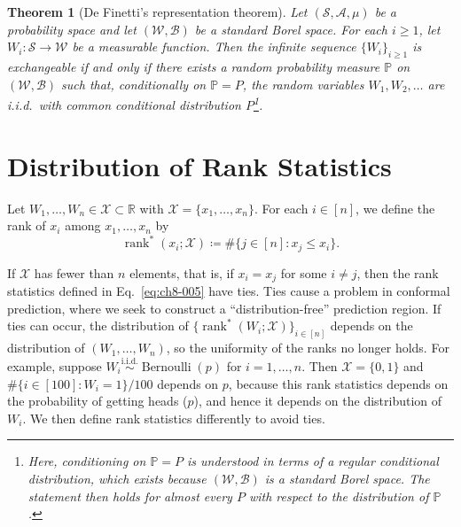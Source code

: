\documentclass[a4paper,12pt]{article}
\numberwithin{equation}{section}
\newcommand{\iid}{\overset{\text{i.i.d.}}{\sim}}
\theoremstyle{plain}
\newtheorem{theorem}{Theorem}[section]
\theoremstyle{definition}
\theoremstyle{remark}
\begin{document}
\begin{theorem}[De Finetti's representation theorem]
\label{theorem:ch8-07}
    Let $(\mathcal{S},\mathcal{A},\mu)$ be a probability space and let $(\mathcal{W},\mathcal{B})$ be a standard Borel space. For each $i\geq 1$, let $W_i:\mathcal{S}\to\mathcal{W}$ be a measurable function. Then the infinite sequence $\{W_i\}_{i\geq 1}$ is exchangeable if and only if there exists a random probability measure $\mathbb{P}$ on $(\mathcal{W},\mathcal{B})$ such that, conditionally on $\mathbb{P}=P$, the random variables $W_1,W_2,\dots$ are i.i.d.\ with common conditional distribution $P$\footnote{Here, conditioning on $\mathbb{P}=P$ is understood in terms of a regular conditional distribution, which exists because $(\mathcal{W},\mathcal{B})$ is a standard Borel space. The statement then holds for almost every $P$ with respect to the distribution of $\mathbb{P}$.}.
\end{theorem}

\section{Distribution of Rank Statistics}
Let $W_1,\dots,W_n\in\mathcal{X}\subset\mathbb{R}$ with $\mathcal{X}=\{x_1,\dots,x_n\}$. For each $i\in[n]$, we define the rank of $x_i$ among $x_1,\dots,x_n$ by
\begin{equation}
    \operatorname{rank}^*(x_i;\mathcal{X})\coloneqq\#\{j\in[n]:x_j\leq x_i\}.
    \label{eq:ch8-005}
\end{equation}

If $\mathcal{X}$ has fewer than $n$ elements, that is, if $x_i=x_j$ for some $i\neq j$, then the rank statistics defined in Eq.~\eqref{eq:ch8-005} have ties. Ties cause a problem in conformal prediction, where we seek to construct a ``distribution-free'' prediction region. If ties can occur, the distribution of $\{\operatorname{rank}^*(W_i;\mathcal{X})\}_{i\in[n]}$ depends on the distribution of $(W_1,\dots,W_n)$, so the uniformity of the ranks no longer holds. For example, suppose $W_i\iid \operatorname{Bernoulli}(p)$ for $i=1,\dots,n$. Then $\mathcal{X}=\{0,1\}$ and $\#\{i\in[100]:W_i=1\}/100$ depends on $p$, because this rank statistics depends on the probability of getting heads ($p$), and hence it depends on the distribution of $W_i$. We then define rank statistics differently to avoid ties. 
\end{document}

